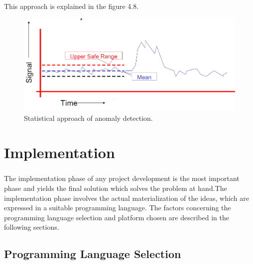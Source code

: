 \documentclass[12pt,a4paper]{report}
\begin{document}
This approach is explained in the figure 4.8.
\begin{figure}[h!]
	\centering
		\includegraphics[scale=0.6]{screenshots/control_chart.png}
		\caption{Statistical approach of anomaly detection.}
\end{figure}




\chapter{Implementation}
\pagestyle{fancy}
\chead{}
\rfoot{\small{\thepage}}
\renewcommand{\headrulewidth}{0.4pt}
\renewcommand{\footrulewidth}{0.4pt}
\paragraph{}The implementation phase of any project development is the most important phase and yields the final solution which solves the problem at hand.The implementation phase involves the actual materialization of the ideas, which are expressed in a suitable programming language. The factors concerning the programming language selection and platform chosen are described in the following sections.
\section{Programming Language Selection}
\end{document}
